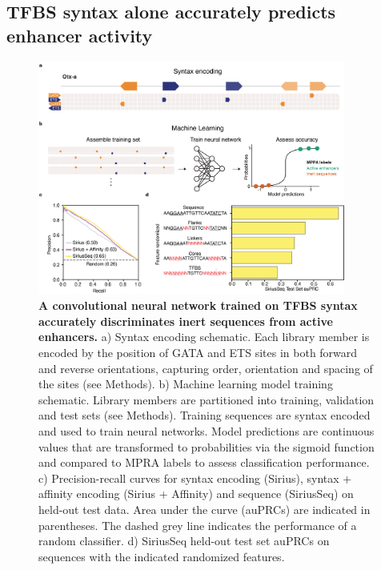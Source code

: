 \subsection{TFBS syntax alone accurately predicts enhancer activity}

\begin{figure}[p]
    \centering
    \includegraphics[width=0.9\textwidth, height=0.745\textheight]{2_figures-and-files/Fig2.png}
    \caption[A convolutional neural network trained on TFBS syntax accurately discriminates inert sequences from active enhancers.]{\textbf{A convolutional neural network trained on TFBS syntax accurately discriminates inert sequences from active enhancers.} a) Syntax encoding schematic. Each library member is encoded by the position of GATA and ETS sites in both forward and reverse orientations, capturing order, orientation and spacing of the sites (see Methods). b) Machine learning model training schematic. Library members are partitioned into training, validation and test sets (see Methods). Training sequences are syntax encoded and used to train neural networks. Model predictions are continuous values that are transformed to probabilities via the sigmoid function and compared to MPRA labels to assess classification performance. c) Precision-recall curves for syntax encoding (Sirius), syntax + affinity encoding (Sirius + Affinity) and sequence (SiriusSeq) on held-out test data. Area under the curve (auPRCs) are indicated in parentheses. The dashed grey line indicates the performance of a random classifier. d) SiriusSeq held-out test set auPRCs on sequences with the indicated randomized features.}
    \label{fig:2 Figure 2}
\end{figure}

